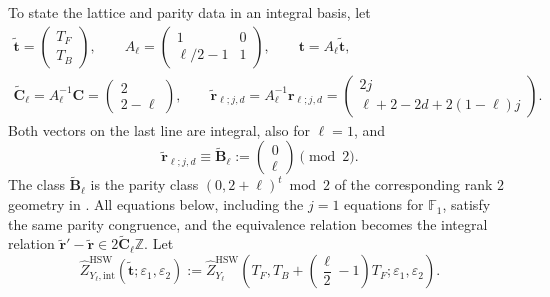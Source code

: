 \documentclass{amsart}
\theoremstyle{definition}
\numberwithin{equation}{section}
\newcommand{\Z}{\mathbb Z}
\newcommand{\eps}{\varepsilon}
\begin{document}
To state the lattice and parity data in an integral basis, let
\begin{equation}
\begin{gathered}
 \widetilde{\mathbf t}=\begin{pmatrix}T_F\\T_B\end{pmatrix},\qquad
 A_\ell=\begin{pmatrix}1&0\\ \ell/2-1&1\end{pmatrix},\qquad
 \mathbf t=A_\ell\widetilde{\mathbf t},\\
 \widetilde{\mathbf C}_\ell=A_\ell^{-1}\mathbf C
 =\begin{pmatrix}2\\2-\ell\end{pmatrix},\qquad
 \widetilde{\mathbf r}_{\ell;j,d}=A_\ell^{-1}\mathbf r_{\ell;j,d}
 =\begin{pmatrix}
 2j\\ \ell+2-2d+2(1-\ell)j
 \end{pmatrix}.
\end{gathered}
\label{eq:Hirzebruch-integral-HSW-data}
\end{equation}
Both vectors on the last line are integral, also for \(\ell=1\), and
\begin{equation}
 \widetilde{\mathbf r}_{\ell;j,d}
 \equiv \widetilde{\mathbf B}_\ell
 :=\begin{pmatrix}0\\\ell\end{pmatrix}\pmod{2}.
\label{eq:Hirzebruch-common-checkerboard}
\end{equation}
The class \(\widetilde{\mathbf B}_\ell\) is the parity class \((0,2+\ell)^t\bmod 2\) of the corresponding rank \(2\) geometry in \cite[Section~3.4]{HuangSunWang}.  All equations below, including the \(j=1\) equations for \(\mathbb F_1\), satisfy the same parity congruence, and the equivalence relation becomes the integral relation \(\widetilde{\mathbf r}'-\widetilde{\mathbf r} \in2\widetilde{\mathbf C}_\ell\Z\).  Let
\[
 \widehat Z_{Y_\ell,\mathrm{int}}^{\mathrm{HSW}}
 (\widetilde{\mathbf t};\eps_1,\eps_2)
 :=\widehat Z_{Y_\ell}^{\mathrm{HSW}}
 \left(T_F,T_B+\left(\frac\ell2-1\right)T_F;
 \eps_1,\eps_2\right).
\]
\end{document}
